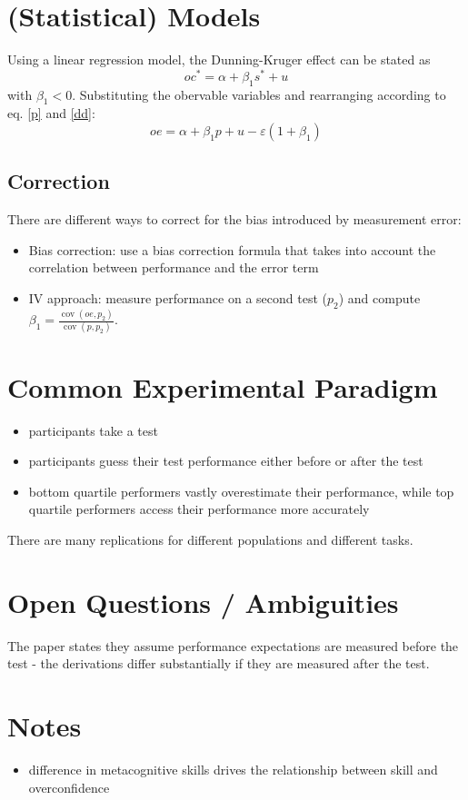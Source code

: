 \documentclass[a4paper,11pt]{article}
\renewcommand*{\epsilon}{\varepsilon}%
\newcommand{\1}{\mathbf{1}}
\DeclareMathOperator{\cov}{cov}
\begin{document}
\section{(Statistical) Models}
Using a linear regression model, the Dunning-Kruger effect can be stated as
\begin{equation}
 oc^* = \alpha + \beta_1 s^* + u
\end{equation}
with $\beta_1 < 0$.
Substituting the obervable variables and rearranging according to eq. \ref{p} and \ref{dd}:
\begin{equation}
  oe = \alpha + \beta_1 p + u - \epsilon(1 + \beta_1)
\end{equation}

\subsection{Correction}
There are different ways to correct for the bias introduced by measurement error:
\begin{itemize}
 \item Bias correction: use a bias correction formula that takes into account the correlation between performance and the error term
 \item IV approach: measure performance on a second test ($p_2$) and compute $\beta_1 = \frac{\cov(oe, p_2)}{\cov(p, p_2)}$.
\end{itemize}

\section{Common Experimental Paradigm}
\begin{itemize}
 \item participants take a test
 \item participants guess their test performance either before or after the test
 \item bottom quartile performers vastly overestimate their performance, while top quartile performers access their performance more accurately
\end{itemize}

There are many replications for different populations and different tasks.

\section{Open Questions / Ambiguities}
The paper states they assume performance expectations are measured before the test - the derivations differ substantially if they are measured after the test.

\section{Notes}
\begin{itemize}
 \item difference in metacognitive skills drives the relationship between skill and overconfidence
\end{itemize}
\end{document}
